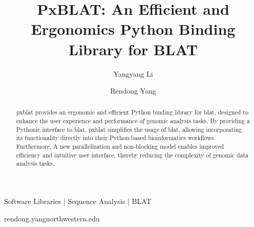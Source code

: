 
\title{PxBLAT: An Efficient and Ergonomics Python Binding Library for BLAT}

\author[1]{Yangyang Li}
\author[1,\Letter]{Rendong Yang }
\date{}

\maketitle

\begin{abstract}
	\acrshort{pxblat} provides an ergonomic and efficient Python binding library for \acrshort{blat}, designed to enhance the user experience and performance of genomic analysis tasks.
	By providing a Pythonic interface to \acrshort{blat}, \acrshort{pxblat} simplifies the usage of \acrshort{blat}, allowing incorporating its functionality directly into their Python-based bioinformatics workflows.
	Furthermore, A new parallelization and non-blocking model enables improved efficiency and intuitive user interface, thereby reducing the complexity of genomic data analysis tasks.
\end{abstract}


\begin{keywords}
	Software Libraries |  Sequence Analysis | BLAT
\end{keywords}

\begin{corrauthor}
	rendong.yang\at northwestern.edu
\end{corrauthor}


